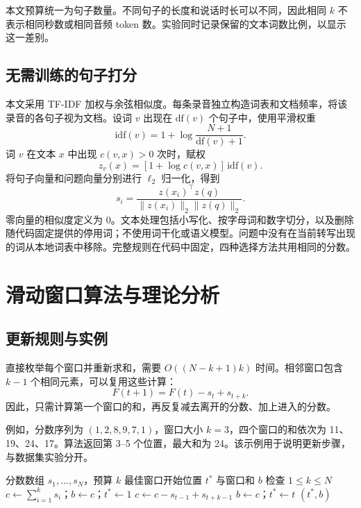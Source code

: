 \documentclass[10pt,journal,compsoc]{IEEEtran}
\begin{document}
本文预算统一为句子数量。不同句子的长度和说话时长可以不同，因此相同 $k$ 不表示相同秒数或相同音频 token 数。实验同时记录保留的文本词数比例，以显示这一差别。

\subsection{无需训练的句子打分}
本文采用 TF-IDF 加权与余弦相似度\cite{manning2008ir}。每条录音独立构造词表和文档频率，将该录音的各句子视为文档。设词 $v$ 出现在 $\mathrm{df}(v)$ 个句子中，使用平滑权重
\begin{equation}
 \mathrm{idf}(v)=1+\log\frac{N+1}{\mathrm{df}(v)+1}.
\end{equation}
词 $v$ 在文本 $x$ 中出现 $c(v,x)>0$ 次时，赋权
\begin{equation}
 z_v(x)=[1+\log c(v,x)]\,\mathrm{idf}(v).
\end{equation}
将句子向量和问题向量分别进行 $\ell_2$ 归一化，得到
\begin{equation}
 s_i=\frac{z(x_i)^\top z(q)}{\|z(x_i)\|_2\|z(q)\|_2}.
 \label{eq:score}
\end{equation}
零向量的相似度定义为 0。文本处理包括小写化、按字母词和数字切分，以及删除随代码固定提供的停用词；不使用词干化或语义模型。问题中没有在当前转写出现的词从本地词表中移除。完整规则在代码中固定，四种选择方法共用相同的分数。

\section{滑动窗口算法与理论分析}
\subsection{更新规则与实例}
直接枚举每个窗口并重新求和，需要 $O((N-k+1)k)$ 时间。相邻窗口包含 $k-1$ 个相同元素，可以复用这些计算：
\begin{equation}
 F(t+1)=F(t)-s_t+s_{t+k}.
 \label{eq:update}
\end{equation}
因此，只需计算第一个窗口的和，再反复减去离开的分数、加上进入的分数。

例如，分数序列为 $(1,2,8,9,7,1)$，窗口大小 $k=3$，四个窗口的和依次为 11、19、24、17。算法返回第 3--5 个位置，最大和为 24。该示例用于说明更新步骤，与数据集实验分开。

\begin{algorithm}[t]
\caption{固定句数最大分数窗口}\label{alg:window}
\begin{algorithmic}[1]
\Require 分数数组 $s_1,\ldots,s_N$，预算 $k$
\Ensure 最佳窗口开始位置 $t^*$ 与窗口和 $b$
\State 检查 $1\le k\le N$
\State $c\gets\sum_{i=1}^{k}s_i$；$b\gets c$；$t^*\gets1$
 \State $c\gets c-s_{t-1}+s_{t+k-1}$
  \State $b\gets c$；$t^*\gets t$
 \EndIf
\EndFor
\State \Return $(t^*,b)$
\end{algorithmic}
\end{algorithm}
\end{document}
